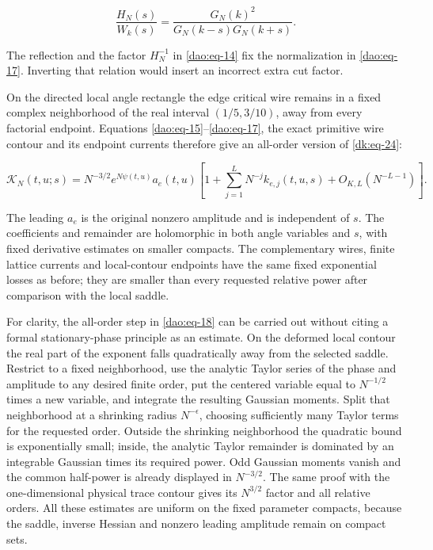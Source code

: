 \begin{equation}\label{dao:eq-17}
\frac{H_N(s)}{W_k(s)}
       =\frac{G_N(k)^2}{G_N(k-s)G_N(k+s)}.
\end{equation}

The reflection and the factor \(H_N^{-1}\) in \eqref{dao:eq-14} fix the normalization in \eqref{dao:eq-17}. Inverting that relation would insert an incorrect extra cut factor.

On the directed local angle rectangle the edge critical wire remains in a fixed complex neighborhood of the real interval \((1/5,3/10)\), away from every factorial endpoint. Equations \eqref{dao:eq-15}--\eqref{dao:eq-17}, the exact primitive wire contour and its endpoint currents therefore give an all-order version of \eqref{dk:eq-24}:

\begin{equation}\label{dao:eq-18}
\mathscr K_N(t,u;s)=N^{-3/2}e^{N\psi(t,u)}a_e(t,u)
       \left[1+\sum_{j=1}^{L}N^{-j}k_{e,j}(t,u,s)
                         +O_{K,L}(N^{-L-1})\right].
\end{equation}

The leading \(a_e\) is the original nonzero amplitude and is independent of \(s\). The coefficients and remainder are holomorphic in both angle variables and \(s\), with fixed derivative estimates on smaller compacts. The complementary wires, finite lattice currents and local-contour endpoints have the same fixed exponential losses as before; they are smaller than every requested relative power after comparison with the local saddle.

For clarity, the all-order step in \eqref{dao:eq-18} can be carried out without citing a formal stationary-phase principle as an estimate. On the deformed local contour the real part of the exponent falls quadratically away from the selected saddle. Restrict to a fixed neighborhood, use the analytic Taylor series of the phase and amplitude to any desired finite order, put the centered variable equal to \(N^{-1/2}\) times a new variable, and integrate the resulting Gaussian moments. Split that neighborhood at a shrinking radius \(N^{-\epsilon}\), choosing sufficiently many Taylor terms for the requested order. Outside the shrinking neighborhood the quadratic bound is exponentially small; inside, the analytic Taylor remainder is dominated by an integrable Gaussian times its required power. Odd Gaussian moments vanish and the common half-power is already displayed in \(N^{-3/2}\). The same proof with the one-dimensional physical trace contour gives its \(N^{3/2}\) factor and all relative orders. All these estimates are uniform on the fixed parameter compacts, because the saddle, inverse Hessian and nonzero leading amplitude remain on compact sets.

